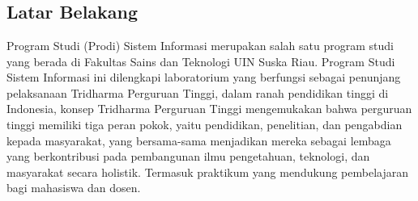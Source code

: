 %


%

\chapter{\babSatu}

\section{Latar Belakang}
Program Studi (Prodi) Sistem Informasi merupakan salah satu program studi yang berada di Fakultas Sains dan Teknologi UIN Suska Riau. Program Studi Sistem Informasi ini dilengkapi laboratorium yang berfungsi sebagai penunjang pelaksanaan Tridharma Perguruan Tinggi, dalam ranah pendidikan tinggi di Indonesia, konsep Tridharma Perguruan Tinggi mengemukakan bahwa perguruan tinggi memiliki tiga peran pokok, yaitu pendidikan, penelitian, dan pengabdian kepada masyarakat, yang bersama-sama menjadikan mereka sebagai lembaga yang berkontribusi pada pembangunan ilmu pengetahuan, teknologi, dan masyarakat secara holistik. Termasuk praktikum yang mendukung pembelajaran bagi mahasiswa dan dosen.

